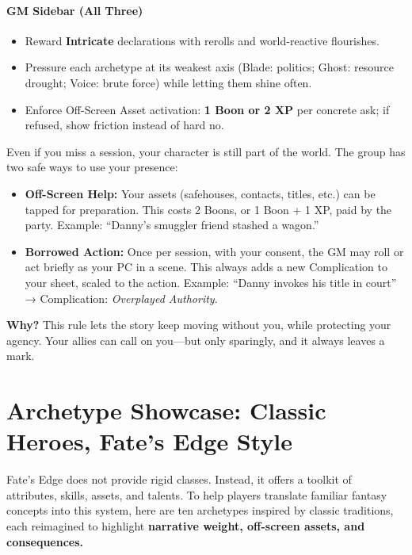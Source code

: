 \documentclass[11pt]{book}
\begin{document}
\paragraph{GM Sidebar (All Three)}
\begin{itemize}
  \item Reward \textbf{Intricate} declarations with rerolls and world-reactive flourishes.
  \item Pressure each archetype at its weakest axis (Blade: politics; Ghost: resource drought; Voice: brute force) while letting them shine often.
  \item Enforce Off-Screen Asset activation: \textbf{1 Boon or 2 XP} per concrete ask; if refused, show friction instead of hard no.
\end{itemize}
\begin{tcolorbox}[colback=gray!10!white,colframe=black,title=Absent PCs]
  Even if you miss a session, your character is still part of the world.  
  The group has two safe ways to use your presence:  
  
  \begin{itemize}
    \item \textbf{Off-Screen Help:} Your assets (safehouses, contacts, titles, etc.) can be tapped for preparation. This costs 2 Boons, or 1 Boon + 1 XP, paid by the party. Example: “Danny’s smuggler friend stashed a wagon.”  
    \item \textbf{Borrowed Action:} Once per session, with your consent, the GM may roll or act briefly as your PC in a scene. This always adds a new Complication to your sheet, scaled to the action. Example: “Danny invokes his title in court” → Complication: \emph{Overplayed Authority}.  
  \end{itemize}
  
  \textbf{Why?} This rule lets the story keep moving without you, while protecting your agency.  
  Your allies can call on you—but only sparingly, and it always leaves a mark.  
  \end{tcolorbox}

  \section{Archetype Showcase: Classic Heroes, Fate's Edge Style}

\noindent
Fate’s Edge does not provide rigid classes. Instead, it offers a toolkit of
attributes, skills, assets, and talents. To help players translate familiar
fantasy concepts into this system, here are ten archetypes inspired by
classic traditions, each reimagined to highlight \textbf{narrative weight,
off-screen assets, and consequences.}
\end{document}
